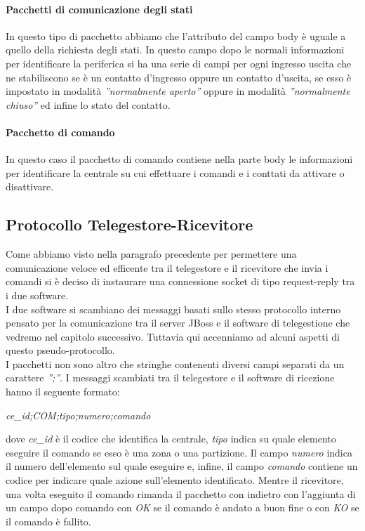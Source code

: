 \paragraph{Pacchetti di comunicazione degli stati}
In questo tipo di pacchetto abbiamo che l'attributo del campo body è uguale a quello della richiesta degli stati. In questo campo dopo le normali informazioni per identificare la periferica si ha una serie di campi per ogni ingresso uscita che ne stabiliscono se è un contatto d'ingresso oppure un contatto d'uscita, se esso è impostato in modalità \emph{''normalmente aperto''} oppure in modalità \emph{''normalmente chiuso''} ed infine lo stato del contatto.
\paragraph{Pacchetto di comando}
In questo caso il pacchetto di comando contiene nella parte body le informazioni per identificare la centrale su cui effettuare i comandi e i conttati da attivare o disattivare.
\subsection{Protocollo Telegestore-Ricevitore}
Come abbiamo visto nella paragrafo precedente per permettere una comunicazione veloce ed efficente tra il telegestore e il ricevitore che invia i comandi si è deciso di instaurare una connessione socket di tipo request-reply tra i due software.\\
I due software si scambiano dei messaggi basati sullo stesso protocollo interno pensato per la comunicazione tra il server JBoss e il software di telegestione che vedremo nel capitolo successivo. Tuttavia qui accenniamo ad alcuni aspetti di questo pseudo-protocollo.\\
I pacchetti non sono altro che stringhe contenenti diversi campi separati da un carattere \emph{'';''}. I messaggi scambiati tra il telegestore e il software di ricezione hanno il seguente formato:
\begin{center}
	\textit{ce\_id;COM;tipo;numero;comando}
\end{center}
dove \emph{ce\_id} è il codice che identifica la centrale, \emph{tipo} indica su quale elemento eseguire il comando se esso è una zona o una partizione. Il campo \emph{numero} indica il numero dell'elemento sul quale eseguire e, infine, il campo \emph{comando} contiene un codice per indicare quale azione sull'elemento identificato. Mentre il ricevitore, una volta eseguito il comando rimanda il pacchetto con indietro con l'aggiunta di un campo dopo comando con \emph{OK} se il comando è andato a buon fine o con \emph{KO} se il comando è fallito.
